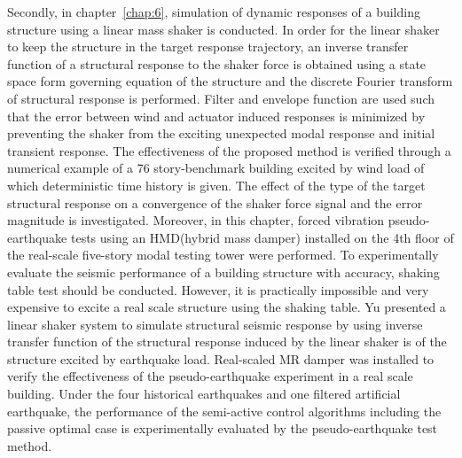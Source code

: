 Secondly, in chapter~\ref{chap:6}, simulation of dynamic responses of a building structure using a linear mass shaker is conducted. In order for the linear shaker to keep the structure in the target response trajectory, an inverse transfer function of a structural response to the shaker force is obtained using a state space form governing equation of the structure and the discrete Fourier transform of structural response is performed. Filter and envelope function are used such that the error between wind and actuator induced responses is minimized by preventing the shaker from the exciting unexpected modal response and initial transient response. The effectiveness of the proposed method is verified through a numerical example of a 76 story-benchmark building excited by wind load of which deterministic time history is given. The effect of the type of the target structural response on a convergence of the shaker force signal and the error magnitude is investigated. Moreover, in this chapter, forced vibration pseudo-earthquake tests using an HMD(hybrid mass damper) installed on the 4th floor of the real-scale five-story modal testing tower were performed. To experimentally evaluate the seismic performance of a building structure with accuracy, shaking table test should be conducted. However, it is practically impossible and very expensive to excite a real scale structure using the shaking table. Yu presented a linear shaker system to simulate structural seismic response by using inverse transfer function of the structural response induced by the linear shaker \citep{yu2005forced} is of the structure excited by earthquake load. Real-scaled MR damper was installed to verify the effectiveness of the pseudo-earthquake experiment in a real scale building. Under the four historical earthquakes and one filtered artificial earthquake, the performance of the semi-active control algorithms including the passive optimal case is experimentally evaluated by the pseudo-earthquake test method.



